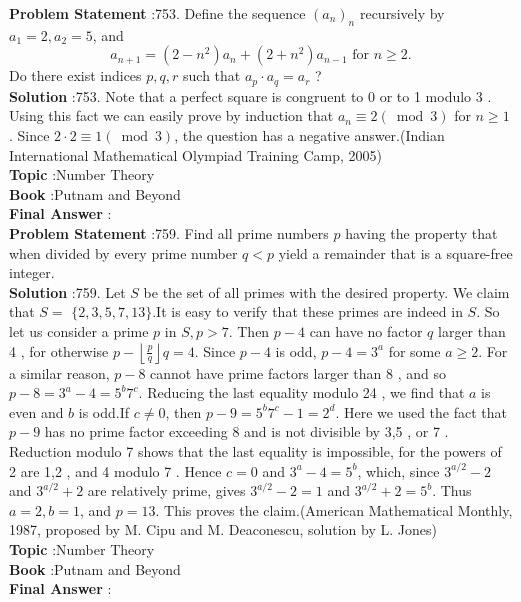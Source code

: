 \documentclass[10pt]{article}
\begin{document}
\textbf{Problem Statement} :753. Define the sequence $\left(a_{n}\right)_{n}$ recursively by $a_{1}=2, a_{2}=5$, and$$ a_{n+1}=\left(2-n^{2}\right) a_{n}+\left(2+n^{2}\right) a_{n-1} \text { for } n \geq 2 . $$Do there exist indices $p, q, r$ such that $a_{p} \cdot a_{q}=a_{r}$ ?\\
\textbf{Solution} :753. Note that a perfect square is congruent to 0 or to 1 modulo 3 . Using this fact we can easily prove by induction that $a_{n} \equiv 2(\bmod 3)$ for $n \geq 1$. Since $2 \cdot 2 \equiv 1(\bmod 3)$, the question has a negative answer.(Indian International Mathematical Olympiad Training Camp, 2005)\\
\textbf{Topic} :Number Theory\\
\textbf{Book} :Putnam and Beyond\\
\textbf{Final Answer} :\\


\textbf{Problem Statement} :759. Find all prime numbers $p$ having the property that when divided by every prime number $q<p$ yield a remainder that is a square-free integer.\\
\textbf{Solution} :759. Let $S$ be the set of all primes with the desired property. We claim that $S=$ $\{2,3,5,7,13\}$.It is easy to verify that these primes are indeed in $S$. So let us consider a prime $p$ in $S, p>7$. Then $p-4$ can have no factor $q$ larger than 4 , for otherwise $p-\left\lfloor\frac{p}{q}\right\rfloor q=4$. Since $p-4$ is odd, $p-4=3^{a}$ for some $a \geq 2$. For a similar reason, $p-8$ cannot have prime factors larger than 8 , and so $p-8=3^{a}-4=5^{b} 7^{c}$. Reducing the last equality modulo 24 , we find that $a$ is even and $b$ is odd.If $c \neq 0$, then $p-9=5^{b} 7^{c}-1=2^{d}$. Here we used the fact that $p-9$ has no prime factor exceeding 8 and is not divisible by 3,5 , or 7 . Reduction modulo 7 shows that the last equality is impossible, for the powers of 2 are 1,2 , and 4 modulo 7 . Hence $c=0$ and $3^{a}-4=5^{b}$, which, since $3^{a / 2}-2$ and $3^{a / 2}+2$ are relatively prime, gives $3^{a / 2}-2=1$ and $3^{a / 2}+2=5^{b}$. Thus $a=2, b=1$, and $p=13$. This proves the claim.(American Mathematical Monthly, 1987, proposed by M. Cipu and M. Deaconescu, solution by L. Jones) \\
\textbf{Topic} :Number Theory\\
\textbf{Book} :Putnam and Beyond\\
\textbf{Final Answer} :\\
\end{document}
